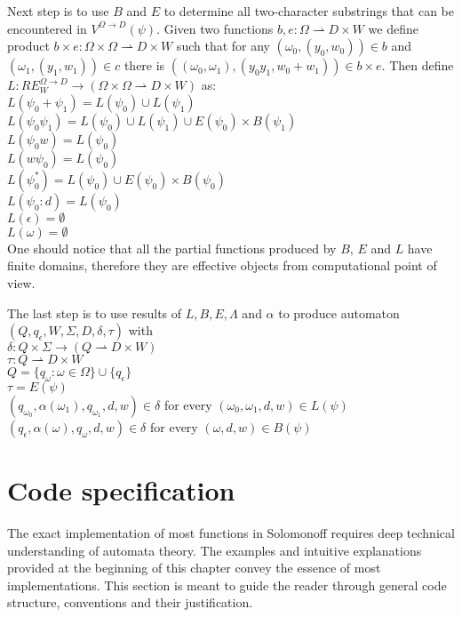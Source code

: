 Next step is to use $B$ and $E$ to determine all two-character substrings that can be encountered in $V^{\Omega\rightarrow D}(\psi)$. Given two functions $b,e:\Omega \rightharpoonup D \times W$ we define product $b \times e : \Omega \times \Omega \rightharpoonup  D \times W$ such that for any $(\omega_0,(y_0,w_0))\in b$ and $(\omega_1,(y_1,w_1)) \in c$ there is $((\omega_0,\omega_1),(y_0y_1,w_0+w_1)) \in b\times e$. Then define $L:RE_W^{\Omega\rightarrow D} \rightarrow (\Omega \times \Omega \rightharpoonup  D \times W)$ as: \\
$L(\psi_0 + \psi_1) = L(\psi_0)\cup L(\psi_1) $ \\
$L(\psi_0 \psi_1) = L(\psi_0) \cup  L(\psi_1) \cup E(\psi_0) \times B(\psi_1)$ \\
$L(\psi_0 w) = L(\psi_0) $ \\
$L(w \psi_0 ) = L(\psi_0)$ \\
$L(\psi_0 ^*) =  L(\psi_0) \cup E(\psi_0) \times B(\psi_0)$ \\
$L(\psi_0 : d) =  L(\psi_0)$ \\
$L(\epsilon) =  \emptyset$ \\
$L(\omega) =  \emptyset$  \\
One should notice that all the partial functions produced by $B$, $E$ and $L$ have finite domains, therefore they are effective objects from computational point of view. 

The last step is to use results of $L,B,E,\Lambda$ and $\alpha$ to produce automaton $(Q,q_\epsilon,W,\Sigma,D,\delta,\tau)$ with \\
$\delta:Q \times \Sigma \rightarrow (Q\rightharpoonup D\times W)$ \\
$\tau:Q\rightharpoonup D \times W$ \\
$Q = \{q_\omega : \omega \in \Omega \} \cup \{q_\epsilon\}$ \\
$\tau = E(\psi)$ \\
$(q_{\omega_0},\alpha(\omega_1),q_{\omega_1},d,w)  \in \delta$ for every $(\omega_0,\omega_1,d,w) \in L(\psi) $ \\
$(q_\epsilon,\alpha(\omega),q_{\omega},d,w)  \in \delta$ for every $(\omega,d,w) \in B(\psi) $ 


\section{Code specification}

The exact implementation of most functions in Solomonoff requires deep technical understanding of automata theory. The examples and intuitive explanations provided at the beginning of this chapter convey the essence of most implementations. This section is meant to guide the reader through general code structure, conventions and their justification. 

